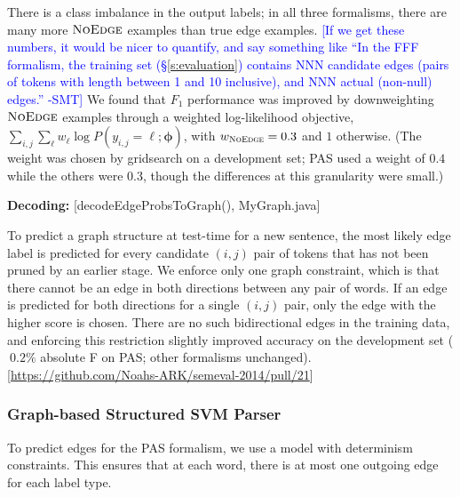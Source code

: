\documentclass[11pt]{article}
\newcommand{\bocomment}[1]{\textcolor{Bittersweet}{[#1 -BTO]}}
\newcommand{\sam}[1]{\textcolor{blue}{[#1 -SMT]}}
\newcommand{\codenote}[1]{\textcolor{PineGreen}{[#1]}}
\newcommand{\noedge}{\textsc{NoEdge}}
\begin{document}
There is a class imbalance in the output labels; in all three formalisms, there
are many more $\noedge$ examples than true edge examples.
\sam{If we get these numbers, it would be nicer to quantify, and say something
like ``In the FFF formalism, the training set (\S\ref{s:evaluation}) contains NNN
candidate edges (pairs of tokens with length between 1 and 10 inclusive), and NNN actual (non-null) edges.''}
We found that $F_1$ performance was improved by
downweighting $\noedge$ examples through a weighted log-likelihood objective,
$\sum_{i,j} \sum_\ell w_\ell \log P(y_{i,j}=\ell; \bm\phi)$, with $w_{\noedge}=0.3$
and $1$ otherwise.
(The weight was chosen by gridsearch on a development set; 
PAS used a weight of $0.4$ while the others were $0.3$, though the differences at this granularity were small.)



\textbf{Decoding:}
\codenote{decodeEdgeProbsToGraph(), MyGraph.java}

To predict a graph structure at test-time for a new sentence,
the most likely edge label is predicted for every candidate $(i, j)$ pair of
tokens that has not been pruned by an earlier stage.
We enforce only one graph constraint, which is that there cannot be
an edge in both directions between any pair of words.
If an edge is predicted for both directions for a single $(i, j)$
pair, only the edge with the higher score is chosen.
There are no such bidirectional edges in the training data, and enforcing this
restriction slightly improved accuracy on the development set ($~0.2\%$ absolute F on PAS; other formalisms unchanged).\codenote{\url{https://github.com/Noahs-ARK/semeval-2014/pull/21}}


\subsubsection{Graph-based Structured SVM Parser} \label{s:graphparser}

To predict edges for the PAS formalism, we use a model with determinism
constraints.  This ensures that at each word, there is at most one
outgoing edge for each label type.
\end{document}
